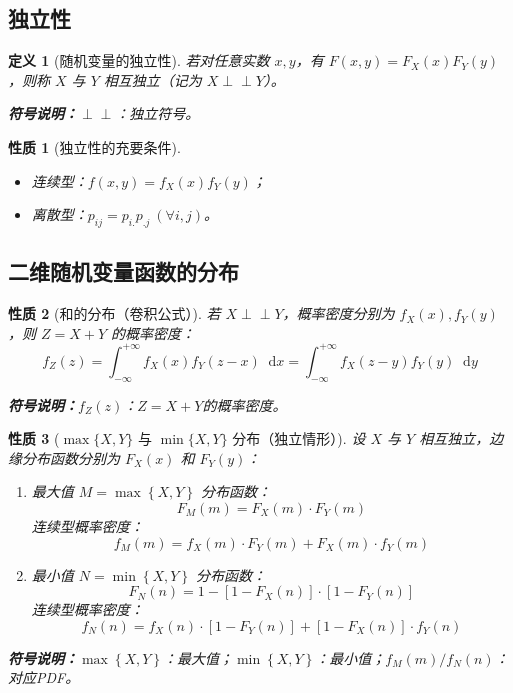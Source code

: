\documentclass{article}
\newcommand{\dif}{\mathop{}\!\mathrm{d}}
\newcommand{\indep}{\perp \!\!\! \perp}
\newcommand{\symnote}[1]{\par\noindent\textbf{符号说明：}#1\par}
\newcommand{\maxrv}[2]{\max\left\{#1,#2\right\}}
\newcommand{\minrv}[2]{\min\left\{#1,#2\right\}}
\theoremstyle{mytheorem}
\newtheorem{definition}{定义}[section]
\newtheorem{property}{性质}[section]
\begin{document}
\subsection{独立性}
\begin{definition}[随机变量的独立性]
若对任意实数 $x,y$，有 $F(x,y) = F_X(x) F_Y(y)$，则称 $X$ 与 $Y$ 相互独立（记为 $X \indep Y$）。
\symnote{$\indep$：独立符号。}
\end{definition}

\begin{property}[独立性的充要条件]
\begin{itemize}
    \item 连续型：$f(x,y) = f_X(x) f_Y(y)$；
    \item 离散型：$p_{ij} = p_{i.} p_{.j} \ (\forall i,j)$。
\end{itemize}
\end{property}

\subsection{二维随机变量函数的分布}
\begin{property}[和的分布（卷积公式）]
若 $X \indep Y$，概率密度分别为 $f_X(x), f_Y(y)$，则 $Z = X + Y$ 的概率密度：
$$
f_Z(z) = \int_{-\infty}^{+\infty} f_X(x) f_Y(z - x) \dif x = \int_{-\infty}^{+\infty} f_X(z - y) f_Y(y) \dif y
$$
\symnote{$f_Z(z)$：$Z=X+Y$的概率密度。}
\end{property}

\begin{property}[$\max\{X,Y\}$ 与 $\min\{X,Y\}$ 分布（独立情形）]
设 $X$ 与 $Y$ 相互独立，边缘分布函数分别为 $F_X(x)$ 和 $F_Y(y)$：
\begin{enumerate}[label=\arabic*.]
    \item 最大值 $M = \maxrv{X}{Y}$
    分布函数：
    $$
    F_M(m) = F_X(m) \cdot F_Y(m)
    $$
    连续型概率密度：
    $$
    f_M(m) = f_X(m) \cdot F_Y(m) + F_X(m) \cdot f_Y(m)
    $$

    \item 最小值 $N = \minrv{X}{Y}$
    分布函数：
    $$
    F_N(n) = 1 - [1 - F_X(n)] \cdot [1 - F_Y(n)]
    $$
    连续型概率密度：
    $$
    f_N(n) = f_X(n) \cdot [1 - F_Y(n)] + [1 - F_X(n)] \cdot f_Y(n)
    $$
\end{enumerate}
\symnote{$\maxrv{X}{Y}$：最大值；$\minrv{X}{Y}$：最小值；$f_M(m)/f_N(n)$：对应PDF。}
\end{property}
\end{document}
